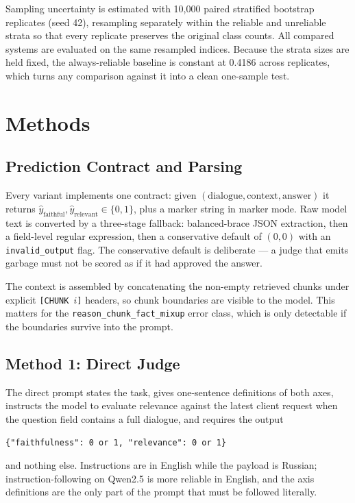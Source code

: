 \documentclass{zapiski}
\begin{document}
Sampling uncertainty is estimated with 10,000 paired stratified bootstrap
replicates (seed 42), resampling separately within the reliable and unreliable
strata so that every replicate preserves the original class counts. All
compared systems are evaluated on the same resampled indices. Because the
strata sizes are held fixed, the always-reliable baseline is constant at
0.4186 across replicates, which turns any comparison against it into a clean
one-sample test.

\section{Methods}
\label{sec:methods}

\subsection{Prediction Contract and Parsing}
\label{sec:contract}

Every variant implements one contract: given
$(\mathrm{dialogue}, \mathrm{context}, \mathrm{answer})$ it returns
$\hat{y}_{\mathrm{faithful}}, \hat{y}_{\mathrm{relevant}} \in \{0,1\}$, plus a
marker string in marker mode. Raw model text is converted by a three-stage
fallback: balanced-brace JSON extraction, then a field-level regular
expression, then a conservative default of $(0,0)$ with an
\texttt{invalid\_output} flag. The conservative default is deliberate --- a
judge that emits garbage must not be scored as if it had approved the answer.

The context is assembled by concatenating the non-empty retrieved chunks under
explicit \texttt{[CHUNK $i$]} headers, so chunk boundaries are visible to the
model. This matters for the \texttt{reason\_chunk\_fact\_mixup} error class,
which is only detectable if the boundaries survive into the prompt.

\subsection{Method 1: Direct Judge}
\label{sec:m1}

The direct prompt states the task, gives one-sentence definitions of both
axes, instructs the model to evaluate relevance against the latest client
request when the question field contains a full dialogue, and requires the
output
\begin{center}
\texttt{\{"faithfulness": 0 or 1, "relevance": 0 or 1\}}
\end{center}
and nothing else. Instructions are in English while the payload is Russian;
instruction-following on Qwen2.5 is more reliable in English, and the axis
definitions are the only part of the prompt that must be followed literally.
\end{document}

